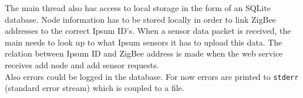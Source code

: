The main thread also has access to local storage in the form of an SQLite database. Node information has to be stored locally in order to link ZigBee addresses to the correct Ipsum ID’s. When a sensor data packet is received, the main needs to look up to what Ipsum sensors it has to upload this data. The relation between Ipsum ID and ZigBee address is made when the web service receives add node and add sensor requests.\\
Also errors could be logged in the database. For now errors are printed to \verb+stderr+ (standard error stream) which is coupled to a file.

